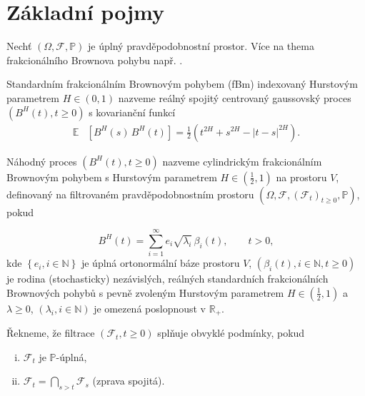 
\chapter{Základní pojmy}

Nechť $\left( \Omega, \mathscr{F}, \mathbb{P} \right)$ je úplný
pravděpodobnostní prostor. Více na thema frakcionálního Brownova pohybu např.
\cite{nourdin2013selected}.


\begin{definice}\label{def:fbm}
    Standardním frakcionálním Brownovým pohybem (\vspace{2pt}fBm) indexovaný
    Hurstovým parametrem $H\in\left(0,1\right)$ nazveme reálný spojitý centrovaný
    gaussovský proces $\left( B^H (t),t\geq 0\right)$ s kovarianční funkcí
    \begin{align*}
      \mathbb{E}& \left[ B^H (s) \, B^H (t) \right] =
      \frac{1}{2}\left( t^{2H}+s^{2H}-|t-s|^{2H} \right).
    \end{align*}
\end{definice}


\begin{definice}
    Náhodný proces $\left(B^H(t),t\geq0\right)$ nazveme cylindrickým frakcionálním Brownovým
    pohybem s Hurstovým parametrem $H\in\left(\frac{1}{2},1\right)$ na prostoru $V$, definovaný na
    filtrovaném pravděpodobnostním prostoru $\left( \Omega, \mathscr{F}, \left(
    \mathscr{F}_t\right)_{t\geq0},\mathbb{P} \right)$, pokud
    
    $$ B^H(t) = \sum_{i=1}^\infty e_i \sqrt{\lambda_i}\, \beta_i (t), \qquad
    t>0,$$
    kde $\left\{ e_i, i\in\mathbb{N} \right\}$ je úplná ortonormální báze
    prostoru $V$, $\left( \beta_i(t),i\in\mathbb{N},t\geq0 \right)$ je rodina
    (stochasticky) nezávislých, reálných standardních frakcionálních
    Brownových pohybů s pevně zvoleným Hurstovým parametrem $H\in\left(
    {\frac{1}{2},1}\right)$ a $\lambda\geq0$, $\left(
    \lambda_i,i\in\mathbb{N} \right)$ je omezená poslopnoust v
    $\mathbb{R}_+$.
\end{definice}


\begin{definice}
    Řekneme, že filtrace $\left( \mathscr{F}_t,t\geq0 \right)$ splňuje obvyklé podmínky, pokud
    \begin{enumerate}[(i)]
        \item $\mathscr{F}_t$ je $\mathbb{P}$-úplná,
        \item $\mathscr{F}_t = \bigcap_{s>t} \mathscr{F}_s$  (zprava spojitá).
    \end{enumerate}
\end{definice}



